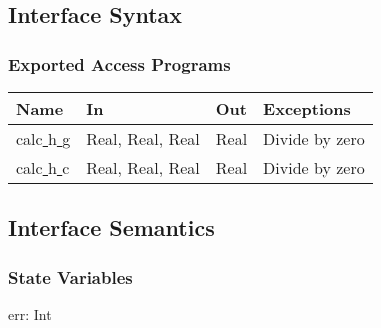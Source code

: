 \documentclass{article}
\begin{document}

\subsection*{Interface Syntax}



\subsubsection*{Exported Access Programs}

\begin{center}
\begin{tabular}{p{} p{} p{} p{}}
  \toprule
  \textbf{Name} & \textbf{In} & \textbf{Out} & \textbf{Exceptions}\\
  \midrule
  calc\underline{{ }{ }}h\underline{{ }{ }}g & Real, Real, Real & Real & Divide by zero \\
  calc\underline{{ }{ }}h\underline{{ }{ }}c & Real, Real, Real & Real & Divide by zero \\
  \bottomrule
\end{tabular}
\end{center}


\subsection*{Interface Semantics}

\subsubsection*{State Variables}
err: Int

\end{document}
